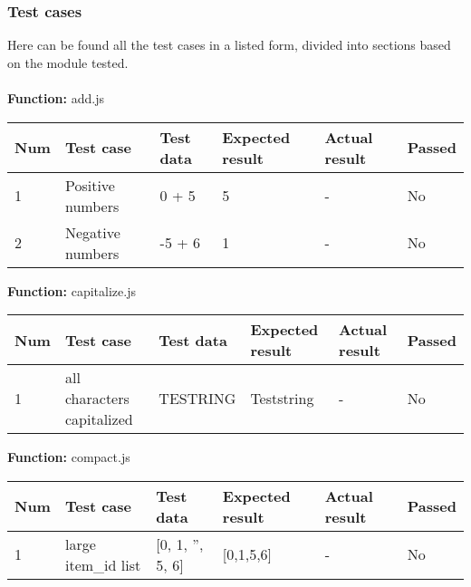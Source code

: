 \documentclass[a4paper, 12pt]{article}
\begin{document}
        \subsubsection{Test cases}
        Here can be found all the test cases in a listed form, divided into sections based on the module tested.
        \\
        \\
        \textbf{Function:} add.js
	
        \begin{table}[h!]
           \begin{tabular}{|l|p{3cm}|p{2cm}|p{2cm}|p{2.5cm}|l|}
                \hline
                Num & Test case        					& Test data 					& Expected result 					& Actual result 		& Passed \\ \hline
                1   & Positive numbers 					& 0 + 5     					& 5               					& -             		& No     \\ \hline
                2   & Negative numbers 					& -5 + 6    					& 1               					& -             		& No     \\ \hline
            \end{tabular}
        \end{table}
    
        \textbf{Function:} capitalize.js
    
        \begin{table}[h!]
            \begin{tabular}{|l|p{3cm}|p{2cm}|p{2cm}|p{2.5cm}|l|}
                \hline
                Num & Test case        					& Test data 					& Expected result 					& Actual result 		& Passed \\ \hline
                1   & all characters capitalized 		& TESTRING     					& Teststring            			& -             		& No     \\ \hline
            \end{tabular}
        \end{table}
    
        \textbf{Function:} compact.js
        
        \begin{table}[h!]
           \begin{tabular}{|l|p{3cm}|p{2cm}|p{2cm}|p{2.5cm}|l|}
                \hline
                Num & Test case        					& Test data 					& Expected result 					& Actual result 		& Passed \\ \hline
                1   & large item\_id list 				& {[}0, 1, '', 5, 6{]}     		& {[}0,1,5,6{]}               		& -             		& No     \\ \hline
            \end{tabular}
        \end{table}
    
\end{document}
